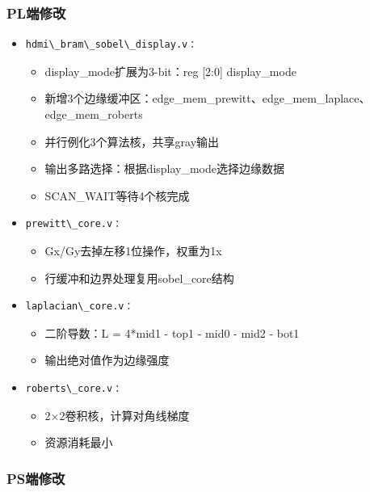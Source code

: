 \subsubsection{PL端修改}

\begin{itemize}
    \item \begin{verbatim}hdmi\_bram\_sobel\_display.v：\end{verbatim}
    \begin{itemize}
        \item display\_mode扩展为3-bit：reg [2:0] display\_mode
        \item 新增3个边缘缓冲区：edge\_mem\_prewitt、edge\_mem\_laplace、edge\_mem\_roberts
        \item 并行例化3个算法核，共享gray输出
        \item 输出多路选择：根据display\_mode选择边缘数据
        \item SCAN\_WAIT等待4个核完成
    \end{itemize}
    \item \begin{verbatim}prewitt\_core.v：\end{verbatim}
    \begin{itemize}
        \item Gx/Gy去掉左移1位操作，权重为1x
        \item 行缓冲和边界处理复用sobel\_core结构
    \end{itemize}
    \item \begin{verbatim}laplacian\_core.v：\end{verbatim}
    \begin{itemize}
        \item 二阶导数：L = 4*mid1 - top1 - mid0 - mid2 - bot1
        \item 输出绝对值作为边缘强度
    \end{itemize}
    \item \begin{verbatim}roberts\_core.v：\end{verbatim}
    \begin{itemize}
        \item 2×2卷积核，计算对角线梯度
        \item 资源消耗最小
    \end{itemize}
\end{itemize}

\subsubsection{PS端修改}


